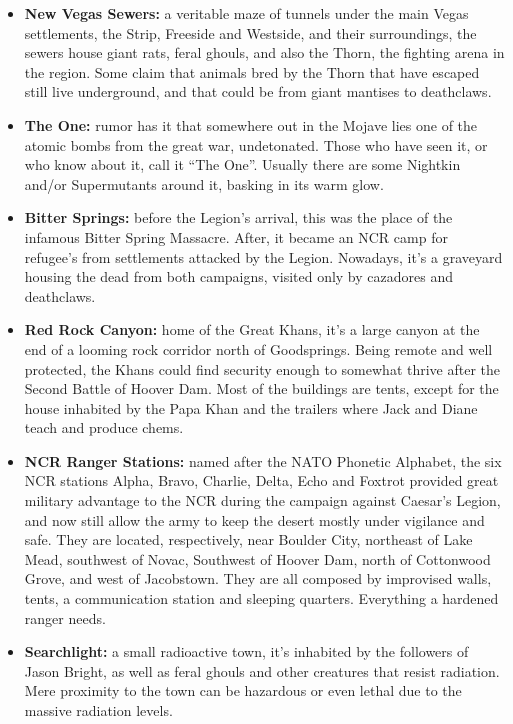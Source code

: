 \begin{itemize}
\item \textbf{New Vegas Sewers:} a veritable maze of tunnels under the main Vegas settlements, the Strip, Freeside and Westside, and their surroundings, the sewers house giant rats, feral ghouls, and also the Thorn, the fighting arena in the region. Some claim that animals bred by the Thorn that have escaped still live underground, and that could be from giant mantises to deathclaws.

\item \textbf{The One:} rumor has it that somewhere out in the Mojave lies one of the atomic bombs from the great war, undetonated. Those who have seen it, or who know about it, call it ``The One''. Usually there are some Nightkin and/or Supermutants around it, basking in its warm glow.

\item \textbf{Bitter Springs:} before the Legion's arrival, this was the place of the infamous Bitter Spring Massacre. After, it became an NCR camp for refugee's from settlements attacked by the Legion. Nowadays, it's a graveyard housing the dead from both campaigns, visited only by cazadores and deathclaws.

\item \textbf{Red Rock Canyon:} home of the Great Khans, it's a large canyon at the end of a looming rock corridor north of Goodsprings. Being remote and well protected, the Khans could find security enough to somewhat thrive after the Second Battle of Hoover Dam. Most of the buildings are tents, except for the house inhabited by the Papa Khan and the trailers where Jack and Diane teach and produce chems.

\item \textbf{NCR Ranger Stations:} named after the NATO Phonetic Alphabet, the six NCR stations Alpha, Bravo, Charlie, Delta, Echo and Foxtrot provided great military advantage to the NCR during the campaign against Caesar's Legion, and now still allow the army to keep the desert mostly under vigilance and safe. They are located, respectively, near Boulder City, northeast of Lake Mead, southwest of Novac, Southwest of Hoover Dam, north of Cottonwood Grove, and west of Jacobstown. They are all composed by improvised walls, tents, a communication station and sleeping quarters. Everything a hardened ranger needs.

\item \textbf{Searchlight:} a small radioactive town, it's inhabited by the followers of Jason Bright, as well as feral ghouls and other creatures that resist radiation. Mere proximity to the town can be hazardous or even lethal due to the massive radiation levels.
\end{itemize}

